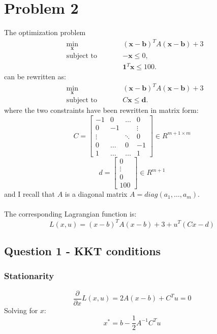 \documentclass[]{article}
\begin{document}
\section*{Problem 2}
The optimization problem
\begin{subequations}
	\begin{alignat*}{2}
		&\!\min_{\mathbf{x}}        &\qquad& (\mathbf{x}-\mathbf{b})^TA(\mathbf{x}-\mathbf{b})+3\\
		&\text{subject to} &      & -\mathbf{x}\leq0,\\
		&                  &      & \mathbf{1}^T\mathbf{x} \leq 100.
	\end{alignat*}
\end{subequations}
can be rewritten as:
\begin{subequations}
	\begin{alignat*}{2}
		&\!\min_{\mathbf{x}}        &\qquad& (\mathbf{x}-\mathbf{b})^TA(\mathbf{x}-\mathbf{b})+3\\
		&\text{subject to} &      & C\mathbf{x}\leq \mathbf{d}.
	\end{alignat*}
\end{subequations}
where the two constraints have been rewritten in matrix form:
\[
C = \begin{bmatrix} 
	-1 & 0 & \dots  & 0\\
	0 & -1 &  & \vdots\\
	\vdots & & \ddots & 0\\
	0 & \dots & 0 & -1\\
	1 &  \dots & \dots     & 1 
\end{bmatrix}
\in R^{m+1 \times m}\] 
\[
d = \begin{bmatrix} 
	0 \\
	\vdots \\
	0\\
	100  
\end{bmatrix}
\in R^{m+1}
\]
and I recall that $A$ is a diagonal matrix $A=diag(a_1,\dots,a_m)$.\\\\
The corresponding Lagrangian function is:
\[
L(x,u) = (x-b)^TA(x-b)+3 + u^T(Cx-d)
\]
\subsection*{Question 1 - KKT conditions}
\subsubsection*{Stationarity}
\begin{equation}
	\label{stationarity}
	\frac{\partial}{\partial x}L(x,u) = 2A(x-b)+C^Tu = 0
\end{equation}
Solving for $x$:
\[
x^* = b-\frac{1}{2}A^{-1}C^Tu
\]
\end{document}
